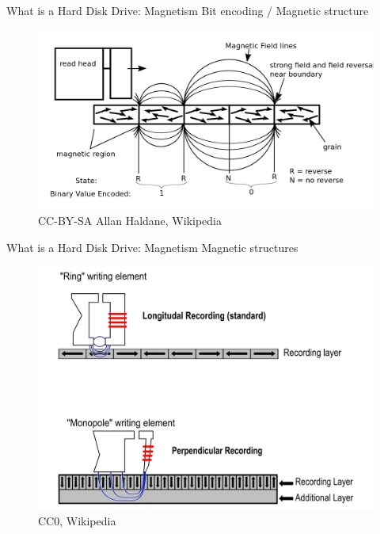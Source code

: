 \documentclass[12pt]{beamer}
\begin{document}
\begin{frame}[fragile]{What is a Hard Disk Drive: Magnetism}
	Bit encoding / Magnetic structure
	\begin{figure}[p]
		\centering
		\includegraphics[width=\linewidth]{img/magnetic_track.png}
		\caption{CC-BY-SA Allan Haldane, Wikipedia}
	\end{figure}
\end{frame}

\begin{frame}[fragile]{What is a Hard Disk Drive: Magnetism}
	Magnetic structures
\begin{figure}[p]
	\centering
	\includegraphics[width=0.75\linewidth]{img/magnetic_type.png}
	\caption{CC0, Wikipedia}
\end{figure}
\end{frame}
\end{document}
